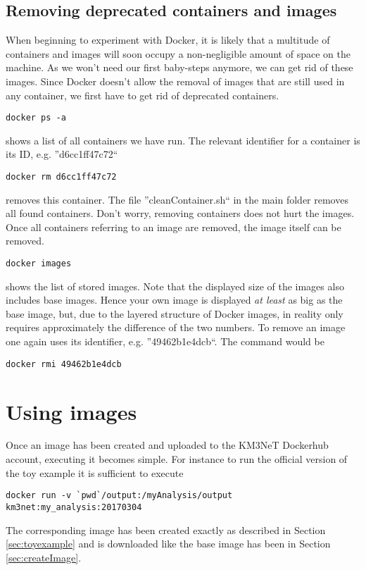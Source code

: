 \documentclass[a4paper, twoside, 11pt]{article}
\begin{document}
\subsection{Removing deprecated containers and images}
When beginning to experiment with Docker, it is likely that a multitude of containers and images will  
soon occupy a non-negligible amount of space on the machine. 
As we won't need our first baby-steps anymore, we can get rid of these images. 
Since Docker doesn't allow the removal of images that are still used in any container, 
we first have to get rid of deprecated containers. 
\begin{lstlisting}[basicstyle=\footnotesize\ttfamily,frame=single]
docker ps -a
\end{lstlisting}
shows a list of all containers we have run. 
The relevant identifier for a container is its ID, e.g. ''d6cc1ff47c72``
\begin{lstlisting}[basicstyle=\footnotesize\ttfamily,frame=single]
docker rm d6cc1ff47c72
\end{lstlisting}
removes this container. 
The file ''cleanContainer.sh`` in the main folder removes all found containers. 
Don't worry, removing containers does not hurt the images. 
Once all containers referring to an image are removed, the image itself can be removed.
\begin{lstlisting}[basicstyle=\footnotesize\ttfamily,frame=single]
docker images
\end{lstlisting}
shows the list of stored images. 
Note that the displayed size of the images also includes base images. 
Hence your own image is displayed \textit{at least} as big as the base image, 
but, due to the layered structure of Docker images, in reality only requires approximately the difference of the two numbers. 
To remove an image one again uses its identifier, e.g. ''49462b1e4dcb``. 
The command would be 
\begin{lstlisting}[basicstyle=\footnotesize\ttfamily,frame=single]
docker rmi 49462b1e4dcb
\end{lstlisting}

\section{Using images}

Once an image has been created and uploaded to the KM3NeT Dockerhub account, executing it becomes simple. 
For instance to run the official version of the toy example it is sufficient to execute
\begin{lstlisting}[basicstyle=\footnotesize\ttfamily,frame=single]
docker run -v `pwd`/output:/myAnalysis/output km3net:my_analysis:20170304
\end{lstlisting}
The corresponding image has been created exactly as described in Section \ref{sec:toyexample} 
and is downloaded like the base image has been in Section \ref{sec:createImage}. 
\end{document}

